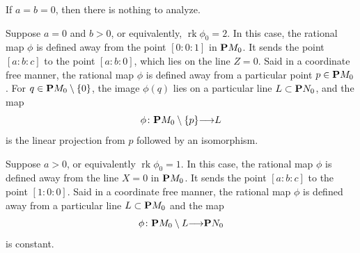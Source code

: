 \documentclass[reqno]{amsart}
\renewcommand{\to}{{\longrightarrow}}
\renewcommand {\P}{{\bf P}}
\providecommand{\rk}{\operatorname{rk}}
\numberwithin{equation}{section}
\begin{document}
If $a = b = 0$, then there is nothing to analyze.

Suppose $a = 0$ and $b > 0$, or equivalently, $\rk \phi_0 = 2$.
In this case, the rational map $\phi$ is defined away from the point $[0:0:1]$ in $\P M_0$.
It sends the point $[a:b:c]$ to the point $[a:b:0]$, which lies on the line $Z = 0$.
Said in a coordinate free manner, the rational map $\phi$ is defined away from a particular point $p \in \P M_0$.
For $q \in \P M_0 \setminus \{0\}$, the image $\phi(q)$ lies on a particular line $L \subset \P N_0$, and the map
\begin{equation}\label{eqn:rk2}
  \phi \colon \P M_0 \setminus \{p\} \to L
\end{equation}
is the linear projection from $p$ followed by an isomorphism.

Suppose $a > 0$, or equivalently $\rk \phi_0 = 1$.
In this case, the rational map $\phi$ is defined away from the line $X = 0$ in $\P M_0$.
It sends the point $[a:b:c]$ to the point $[1:0:0]$.
Said in a coordinate free manner, the rational map $\phi$ is defined away from a particular line $L \subset \P M_0$ and the map
\begin{equation}\label{eqn:rk1}
  \phi \colon \P M_0 \setminus L \to \P N_0
\end{equation}
is constant.
\end{document}
